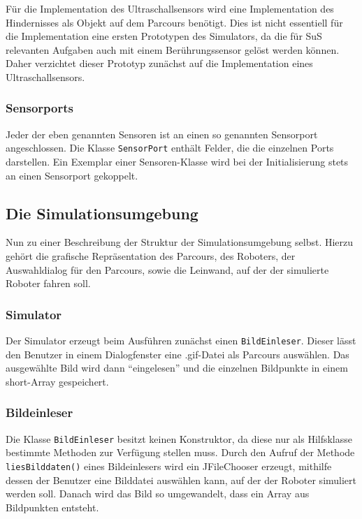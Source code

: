 \documentclass[paper=a4, pagesize, DIV=calc, BCOR=12.5mm, twoside=on, onecolumn=on, open = any, titlepage =on, parskip =half-, headsepline = on, footsepline = on, chapterprefix = on, appendixprefix = off, fontsize = 12pt, numbers = noenddot, abstract = on]{scrbook}
\numberwithin{equation}{chapter}
\theoremstyle{definition}
\theoremstyle{plain}
\theoremstyle{plain}
\theoremstyle{remark}
\theoremstyle{plain}
\theoremstyle{plain}
\begin{document}
Für die Implementation des Ultraschallsensors wird eine Implementation des Hindernisses als Objekt auf dem Parcours benötigt. Dies ist nicht essentiell für die Implementation eine ersten Prototypen des Simulators, da die für SuS relevanten Aufgaben auch mit einem Berührungssensor gelöst werden können. Daher verzichtet dieser Prototyp zunächst auf die Implementation eines Ultraschallsensors.
\subsubsection{Sensorports}
Jeder der eben genannten Sensoren ist an einen so genannten Sensorport angeschlossen. Die Klasse \texttt{SensorPort} enthält Felder, die die einzelnen Ports darstellen. Ein Exemplar einer Sensoren-Klasse wird bei der Initialisierung stets an einen Sensorport gekoppelt. 

\par \singlespacing
\subsection{Die Simulationsumgebung}
\onehalfspacing
Nun zu einer Beschreibung der Struktur der Simulationsumgebung selbst. Hierzu gehört die grafische Repräsentation des Parcours, des Roboters, der Auswahldialog für den Parcours, sowie die Leinwand, auf der der simulierte Roboter fahren soll.
\subsubsection{Simulator}
Der Simulator erzeugt beim Ausführen zunächst einen \texttt{BildEinleser}. Dieser lässt den Benutzer in einem Dialogfenster eine .gif-Datei als Parcours auswählen. Das ausgewählte Bild wird dann "`eingelesen"' und die einzelnen Bildpunkte in einem short-Array gespeichert.
\subsubsection{Bildeinleser}
Die Klasse \texttt{BildEinleser} besitzt keinen Konstruktor, da diese nur als Hilfsklasse bestimmte Methoden zur Verfügung stellen muss. Durch den Aufruf der Methode\\
\texttt{liesBilddaten()} eines Bildeinlesers wird ein JFileChooser erzeugt, mithilfe dessen der Benutzer eine Bilddatei auswählen kann, auf der der Roboter simuliert werden soll. Danach wird das Bild so umgewandelt, dass ein Array aus Bildpunkten entsteht.
\end{document}
